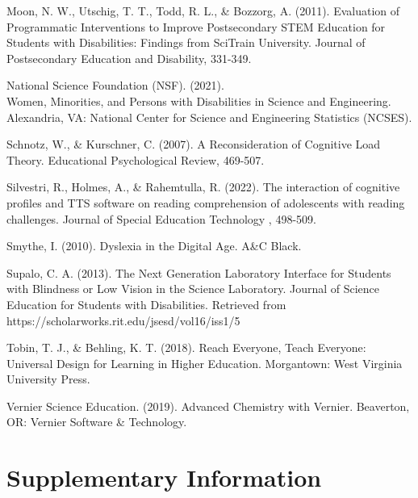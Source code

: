 \documentclass[11.5pt]{sig-alternate}
\begin{document}
\begin{large}
Moon, N. W., Utschig, T. T., Todd, R. L., \& Bozzorg, A. (2011). Evaluation of Programmatic Interventions to Improve Postsecondary STEM Education for Students with Disabilities: Findings from SciTrain University. Journal of Postsecondary Education and Disability, 331-349.

National Science Foundation (NSF). (2021). \\Women, Minorities, and Persons with Disabilities in Science and Engineering. Alexandria, VA: National Center for Science and Engineering Statistics (NCSES).

Schnotz, W., \& Kurschner, C. (2007). A Reconsideration of Cognitive Load Theory. Educational Psychological Review, 469-507.

Silvestri, R., Holmes, A., \& Rahemtulla, R. (2022). The interaction of cognitive profiles and TTS software on reading comprehension of adolescents with reading challenges. Journal of Special Education Technology , 498-509.

Smythe, I. (2010). Dyslexia in the Digital Age. A\&C Black.

Supalo, C. A. (2013). The Next Generation Laboratory Interface for Students with Blindness or Low Vision in the Science Laboratory. Journal of Science Education for Students with Disabilities. Retrieved from https://scholarworks.rit.edu/jsesd/vol16/iss1/5

Tobin, T. J., \& Behling, K. T. (2018). Reach Everyone, Teach Everyone: Universal Design for Learning in Higher Education. Morgantown: West Virginia University Press.

Vernier Science Education. (2019). Advanced Chemistry with Vernier. Beaverton, OR: Vernier Software \& Technology.

\clearpage

\section*{Supplementary Information}


\end{large}
\end{document}
